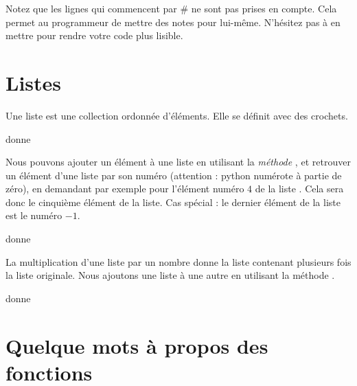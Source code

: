 Notez que les lignes qui commencent par \# ne sont pas prises en compte. Cela permet au programmeur de mettre des notes pour lui-même. N'hésitez pas à en mettre pour rendre votre code plus lisible.


\section{Listes}

Une liste est une collection ordonnée d'éléments. Elle se définit avec des crochets.



donne



Nous pouvons ajouter un élément à une liste en utilisant la \emph{méthode} , et retrouver un élément d'une liste par son numéro (attention : python numérote à partie de zéro), en demandant par exemple  pour l'élément numéro \( 4\) de la liste . Cela sera donc le cinquième élément de la liste. Cas spécial : le dernier élément de la liste est le numéro \( -1\).



donne






La multiplication d'une liste par un nombre donne la liste contenant plusieurs fois la liste originale. Nous ajoutons une liste à une autre en utilisant la méthode .




donne





\section{Quelque mots à propos des fonctions}

